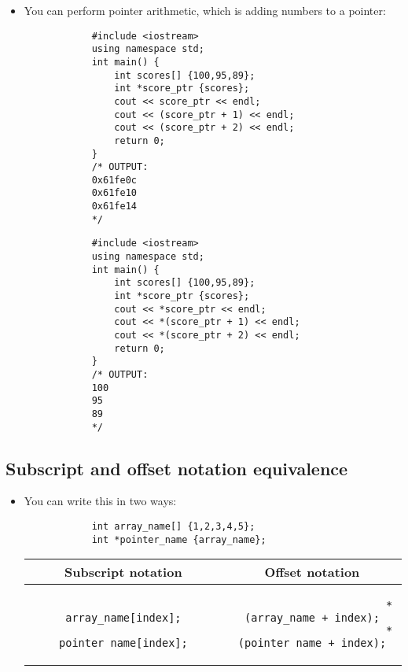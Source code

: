 \begin{itemize}
    \item You can perform pointer arithmetic, which is adding numbers to a pointer:
        \begin{verbatim}
            #include <iostream>
            using namespace std;
            int main() {
                int scores[] {100,95,89};
                int *score_ptr {scores};
                cout << score_ptr << endl;
                cout << (score_ptr + 1) << endl;
                cout << (score_ptr + 2) << endl;
                return 0;
            }
            /* OUTPUT:
            0x61fe0c
            0x61fe10
            0x61fe14
            */
        \end{verbatim}
        \begin{verbatim}
            #include <iostream>
            using namespace std;
            int main() {
                int scores[] {100,95,89};
                int *score_ptr {scores};
                cout << *score_ptr << endl;
                cout << *(score_ptr + 1) << endl;
                cout << *(score_ptr + 2) << endl;
                return 0;
            }
            /* OUTPUT:
            100
            95
            89
            */
        \end{verbatim}
\end{itemize}

\subsection{Subscript and offset notation equivalence}
\begin{itemize}
    \item You can write this in two ways:
        \begin{verbatim}
            int array_name[] {1,2,3,4,5};
            int *pointer_name {array_name};
        \end{verbatim}
        \begin{center}
            \begin{tabular}{ |c|c| }
                \hline
                    Subscript notation & Offset notation \\
                \hline
                    \begin{verbatim}
                        array_name[index];
                        pointer_name[index];
                    \end{verbatim}
                &
                    \begin{verbatim}
                        *(array_name + index);
                        *(pointer_name + index);
                    \end{verbatim}
                \hline
                \\ 
            \end{tabular}
        \end{center}
\end{itemize}


